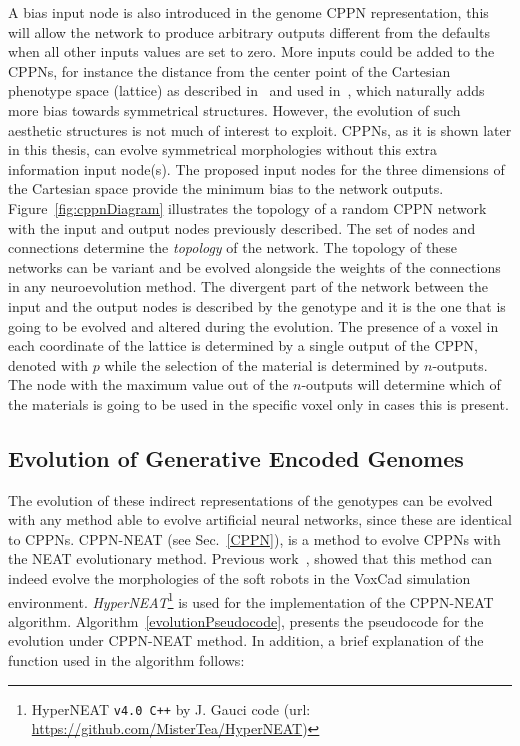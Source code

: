 A bias input node is also introduced in the genome CPPN representation, this will allow the network to produce arbitrary outputs different from the defaults when all other inputs values are set to zero. More inputs could be added to the CPPNs, for instance the distance from the center point of the Cartesian phenotype space (lattice) as described in~\citep{stanley2007compositional} and used in~\citep{cheney2013unshackling}, which naturally adds more bias towards symmetrical structures. However, the evolution of such aesthetic structures is not much of interest to exploit. CPPNs, as it is shown later in this thesis, can evolve symmetrical morphologies without this extra information input node(s). The proposed input nodes for the three dimensions of the Cartesian space provide the minimum bias to the network outputs. Figure~\ref{fig:cppnDiagram} illustrates the topology of a random CPPN network with the input and output nodes previously described. The set of nodes and connections determine the \emph{topology} of the network. The topology of these networks can be variant and be evolved alongside the weights of the connections in any neuroevolution method. The divergent part of the network between the input and the output nodes is described by the genotype and it is the one that is going to be evolved and altered during the evolution. The presence of a voxel in each coordinate of the lattice is determined by a single output of the CPPN, denoted with $p$ while the selection of the material is determined by $n$-outputs. The node with the maximum value out of the $n$-outputs will determine which of the materials is going to be used in the specific voxel only in cases this is present.

\subsection{Evolution of Generative Encoded Genomes}

The evolution of these indirect representations of the genotypes can be evolved with any method able to evolve artificial neural networks, since these are identical to CPPNs. CPPN-NEAT (see Sec.~\ref{CPPN}), is a method to evolve CPPNs with the NEAT evolutionary method. Previous work~\citep{cheney2013unshackling}, showed that this method can indeed evolve the morphologies of the soft robots in the VoxCad simulation environment. \textit{HyperNEAT}\footnote{HyperNEAT \texttt{v4.0 C++} by J. Gauci code (url: \url{https://github.com/MisterTea/HyperNEAT})} is used for the implementation of the CPPN-NEAT algorithm. Algorithm~\ref{evolutionPseudocode}, presents the pseudocode for the evolution under CPPN-NEAT method. In addition, a brief explanation of the function used in the algorithm follows:


